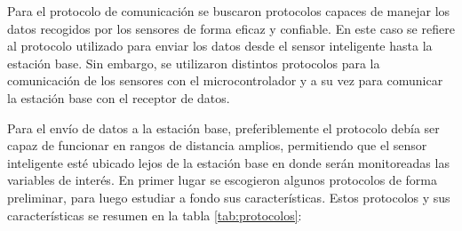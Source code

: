 Para el protocolo de comunicación se buscaron protocolos capaces de manejar los datos recogidos por los sensores de forma eficaz y confiable. En este caso se refiere al protocolo utilizado para enviar los datos desde el sensor inteligente hasta la estación base. Sin embargo, se utilizaron distintos protocolos para la comunicación de los sensores con el microcontrolador y a su vez para comunicar la estación base con el receptor de datos.
	
Para el envío de datos a la estación base, preferiblemente el protocolo debía ser capaz de funcionar en rangos de distancia amplios, permitiendo que el sensor inteligente esté ubicado lejos de la estación base en donde serán monitoreadas las variables de interés. En primer lugar se escogieron algunos protocolos de forma preliminar, para luego estudiar a fondo sus características. Estos protocolos y sus características se resumen en la tabla \ref{tab:protocolos}:

\begin{table}[H]
    \centering
    \caption{Comparación entre protocolos de comunicación inalámbrica, \citep{IoTCompare} y \citep{LPWANCompare}}
    \label{tab:protocolos}
\end{table}


